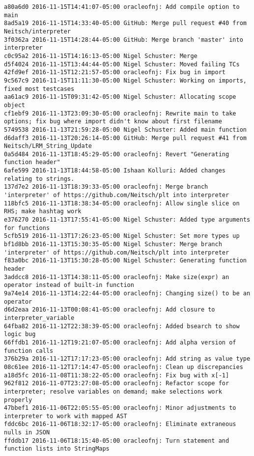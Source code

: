 \begin{lstlisting}
a80a6d0 2016-11-15T14:41:07-05:00 oracleofnj: Add compile option to main
8ad5a19 2016-11-15T14:33:40-05:00 GitHub: Merge pull request #40 from Neitsch/interpreter
3f0362a 2016-11-15T14:28:44-05:00 GitHub: Merge branch 'master' into interpreter
c0c95a2 2016-11-15T14:16:13-05:00 Nigel Schuster: Merge
d5f4024 2016-11-15T13:44:44-05:00 Nigel Schuster: Moved failing TCs
42fd9ef 2016-11-15T12:21:57-05:00 oracleofnj: Fix bug in import
9c567c9 2016-11-15T11:11:30-05:00 Nigel Schuster: Working on imports, fixed most testcases
aa61ac9 2016-11-15T09:31:42-05:00 Nigel Schuster: Allocating scope object
cf1ebf9 2016-11-13T23:09:30-05:00 oracleofnj: Rewrite main to take options; fix bug where import didn't know about first filename
5749538 2016-11-13T21:59:28-05:00 Nigel Schuster: Added main function
d6daff3 2016-11-13T20:26:14-05:00 GitHub: Merge pull request #41 from Neitsch/LRM_String_Update
0a5d484 2016-11-13T18:45:29-05:00 oracleofnj: Revert "Generating function header"
6afe599 2016-11-13T18:44:58-05:00 Ishaan Kolluri: Added changes relating to strings.
137d7e2 2016-11-13T18:39:33-05:00 oracleofnj: Merge branch 'interpreter' of https://github.com/Neitsch/plt into interpreter
118bfc5 2016-11-13T18:38:34-05:00 oracleofnj: Allow single slice on RHS; make hashtag work
e376270 2016-11-13T17:55:41-05:00 Nigel Schuster: Added type arguments for functions
5cfb519 2016-11-13T17:26:23-05:00 Nigel Schuster: Set more types up
bf1d8bb 2016-11-13T15:30:35-05:00 Nigel Schuster: Merge branch 'interpreter' of https://github.com/Neitsch/plt into interpreter
f83a0bc 2016-11-13T15:30:28-05:00 Nigel Schuster: Generating function header
3addcc8 2016-11-13T14:38:11-05:00 oracleofnj: Make size(expr) an operator instead of built-in function
9a74e14 2016-11-13T14:22:44-05:00 oracleofnj: Changing size() to be an operator
d6d2eaa 2016-11-13T00:08:41-05:00 oracleofnj: Add closure to interpreter_variable
64fba82 2016-11-12T22:38:39-05:00 oracleofnj: Added bsearch to show logic bug
66ffdb1 2016-11-12T19:21:07-05:00 oracleofnj: Add alpha version of function calls
376b29a 2016-11-12T17:17:23-05:00 oracleofnj: Add string as value type
08c61ee 2016-11-12T17:14:47-05:00 oracleofnj: Clean up discrepancies
a18d5fc 2016-11-08T11:38:22-05:00 oracleofnj: Fix bug with x[-1]
962f812 2016-11-07T23:27:08-05:00 oracleofnj: Refactor scope for interpreter; resolve variables on demand; make selections work properly
47bbef1 2016-11-06T22:05:55-05:00 oracleofnj: Minor adjustments to interpreter to work with mapped AST
fddc6bc 2016-11-06T18:32:17-05:00 oracleofnj: Eliminate extraneous nulls in JSON
ffddb17 2016-11-06T18:15:40-05:00 oracleofnj: Turn statement and function lists into StringMaps

\end{lstlisting}
